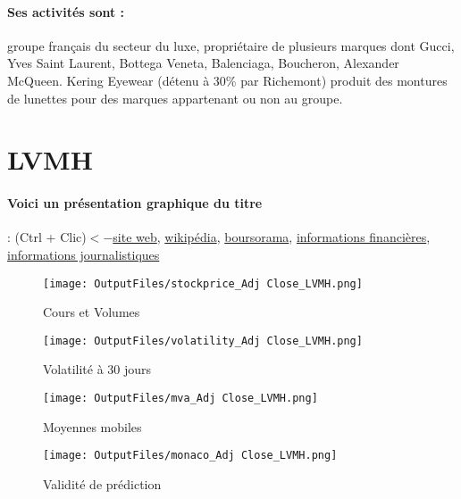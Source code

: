 \documentclass[11pt,a4paper]{report}%
\begin{document}
\paragraph{Ses activités sont : } groupe français du secteur du luxe, propriétaire de plusieurs marques dont Gucci, Yves Saint Laurent, Bottega Veneta, Balenciaga, Boucheron, Alexander McQueen. Kering Eyewear (détenu à 30\% par Richemont) produit des montures de lunettes pour des marques appartenant ou non au groupe.  
    
    \newpage

\section{LVMH}

\paragraph{Voici un présentation graphique du titre} : (Ctrl + Clic)$<-$\href{https://www.lvmh.fr/actionnaires/investisseurs-et-analystes/publications/}{site web}, \href{https://fr.wikipedia.org/wiki/LVMH_-_Mo%C3%ABt_Hennessy_Louis_Vuitton}{wikipédia}, \href{https://www.boursorama.com/cours/1rPMC}{boursorama}, \href{https://www.qwant.com/?q=site:https:%2f%2fwww.easybourse.com%2faction-societe%2fLVMH&t=web&client=ext-firefox-hp}{informations financières}, \href{https://bourse.lerevenu.com/cours-de-bourse/fiche-valeur-synthese/LVMH/MC-FR}{informations journalistiques}
\begin{figure}[!htb]
   \begin{minipage}{0.5\textwidth}
     \centering
     \texttt{[image: OutputFiles/stockprice\_Adj Close\_LVMH.png]}
     \caption{Cours et Volumes}\label{Fig:price_LVMH}
   \end{minipage}\hfill
   \begin{minipage}{0.5\textwidth}
     \centering
     \texttt{[image: OutputFiles/volatility\_Adj Close\_LVMH.png]}
     \caption{Volatilité à 30 jours}\label{Fig:volat_LVMH}
   \end{minipage}
\end{figure}
\begin{figure}[!htb]
   \begin{minipage}{0.5\textwidth}
     \centering
     \texttt{[image: OutputFiles/mva\_Adj Close\_LVMH.png]}
     \caption{Moyennes mobiles}\label{Fig:mva_LVMH}
   \end{minipage}\hfill
   \begin{minipage}{0.5\textwidth}
     \centering
     \texttt{[image: OutputFiles/monaco\_Adj Close\_LVMH.png]}
     \caption{Validité de prédiction}\label{Fig:prediction_LVMH}
   \end{minipage}
\end{figure}
\end{document}

